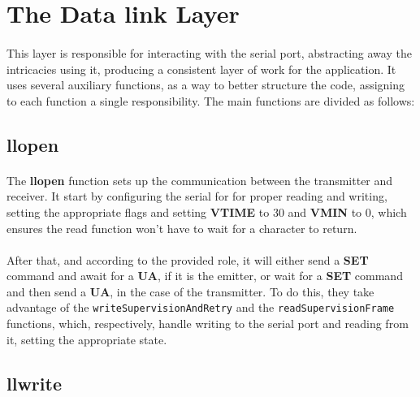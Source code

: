 \documentclass[11pt]{article}
\begin{document}
\section{The Data link Layer}

\paragraph{}This layer is responsible for interacting with the serial port, abstracting away the intricacies
using it, producing a consistent layer of work for the application. It uses several auxiliary functions, as
a way to better structure the code, assigning to each function a single responsibility. The main functions
are divided as follows:

\subsection*{llopen}

\paragraph{}The \textbf{llopen} function sets up the communication between the transmitter and receiver. It
start by configuring the serial for for proper reading and writing, setting the appropriate flags and
setting \textbf{VTIME} to 30 and \textbf{VMIN} to 0, which ensures the read function won't have to wait for
a character to return.

\paragraph{}After that, and according to the provided role, it will either send a \textbf{SET} command and
await for a \textbf{UA}, if it is the emitter, or wait for a \textbf{SET} command and then send a
\textbf{UA}, in the case of the transmitter. To do this, they take advantage of the
\verb|writeSupervisionAndRetry| and the \verb|readSupervisionFrame| functions, which, respectively, handle
writing to the serial port and reading from it, setting the appropriate state.

\subsection*{llwrite}
\end{document}
